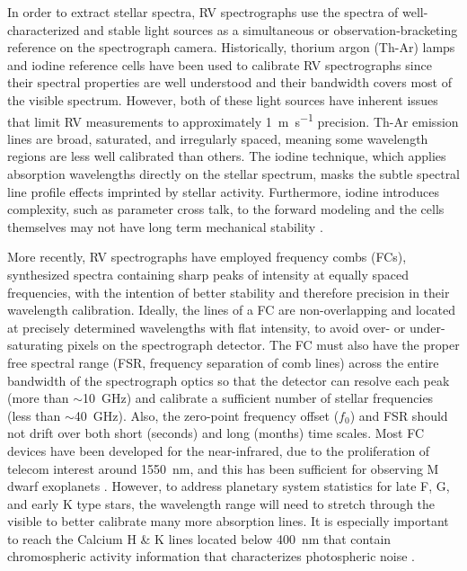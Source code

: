 \documentclass[11pt]{article}
\begin{document}
In order to extract stellar spectra, RV spectrographs use the spectra of well-characterized and stable light sources as a simultaneous or observation-bracketing reference on the spectrograph camera. Historically, thorium argon (Th-Ar) lamps and iodine reference cells have been used to calibrate RV spectrographs since their spectral properties are well understood and their bandwidth covers most of the visible spectrum. However, both of these light sources have inherent issues that limit RV measurements to approximately \SI{1}{\meter\per\second} precision. Th-Ar emission lines are broad, saturated, and irregularly spaced, meaning some wavelength regions are less well calibrated than others. The iodine technique, which applies absorption wavelengths directly on the stellar spectrum, masks the subtle spectral line profile effects imprinted by stellar activity. Furthermore, iodine introduces complexity, such as parameter cross talk, to the forward modeling \citep{Spronck2015} and the cells themselves may not have long term mechanical stability \citep{Fischer2014a}.

More recently, RV spectrographs have employed frequency combs (FCs), synthesized spectra containing sharp peaks of intensity at equally spaced frequencies, with the intention of better stability and therefore precision in their wavelength calibration. Ideally, the lines of a FC are non-overlapping and located at precisely determined wavelengths with flat intensity, to avoid over- or under-saturating pixels on the spectrograph detector. The FC must also have the proper free spectral range (FSR, frequency separation of comb lines) across the entire bandwidth of the spectrograph optics so that the detector can resolve each peak (more than $\sim$\SI{10}{\giga\hertz}) and calibrate a sufficient number of stellar frequencies (less than $\sim$\SI{40}{\giga\hertz}). Also, the zero-point frequency offset ($f_0$) and FSR should not drift over both short (seconds) and long (months) time scales. Most FC devices have been developed for the near-infrared, due to the proliferation of telecom interest around \SI{1550}{\nano\meter}, and this has been sufficient for observing M dwarf exoplanets \citep{Fischer2016}. However, to address planetary system statistics for late F, G, and early K type stars, the wavelength range will need to stretch through the visible to better calibrate many more absorption lines. It is especially important to reach the Calcium H \& K lines located below \SI{400}{\nano\meter} that contain chromospheric activity information that characterizes photospheric noise \citep{Isaacson2010, Lovis2011}.
\end{document}

